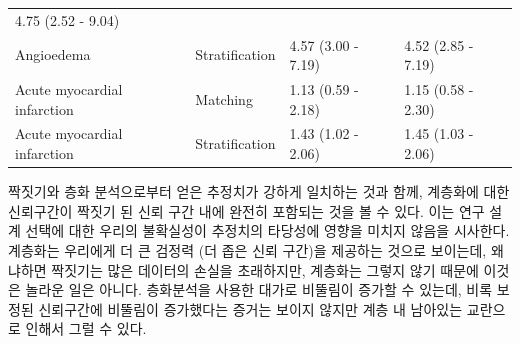 \documentclass[10.5pt]{book}
\theoremstyle{definition}
\theoremstyle{definition}
\theoremstyle{definition}
\theoremstyle{remark}
\begin{document}
\begin{longtable}[]{@{}llll@{}}
\begin{minipage}[t]{0.17\columnwidth}
4.75 (2.52 - 9.04)\strut
\end{minipage}\tabularnewline
\begin{minipage}[t]{0.27\columnwidth}\raggedright\strut
Angioedema\strut
\end{minipage} & \begin{minipage}[t]{0.15\columnwidth}\raggedright\strut
Stratification\strut
\end{minipage} & \begin{minipage}[t]{0.17\columnwidth}\raggedright\strut
4.57 (3.00 - 7.19)\strut
\end{minipage} & \begin{minipage}[t]{0.17\columnwidth}\raggedright\strut
4.52 (2.85 - 7.19)\strut
\end{minipage}\tabularnewline
\begin{minipage}[t]{0.27\columnwidth}\raggedright\strut
Acute myocardial infarction\strut
\end{minipage} & \begin{minipage}[t]{0.15\columnwidth}\raggedright\strut
Matching\strut
\end{minipage} & \begin{minipage}[t]{0.17\columnwidth}\raggedright\strut
1.13 (0.59 - 2.18)\strut
\end{minipage} & \begin{minipage}[t]{0.17\columnwidth}\raggedright\strut
1.15 (0.58 - 2.30)\strut
\end{minipage}\tabularnewline
\begin{minipage}[t]{0.27\columnwidth}\raggedright\strut
Acute myocardial infarction\strut
\end{minipage} & \begin{minipage}[t]{0.15\columnwidth}\raggedright\strut
Stratification\strut
\end{minipage} & \begin{minipage}[t]{0.17\columnwidth}\raggedright\strut
1.43 (1.02 - 2.06)\strut
\end{minipage} & \begin{minipage}[t]{0.17\columnwidth}\raggedright\strut
1.45 (1.03 - 2.06)\strut
\end{minipage}\tabularnewline
\bottomrule
\end{longtable}

짝짓기와 층화 분석으로부터 얻은 추정치가 강하게 일치하는 것과 함께,
계층화에 대한 신뢰구간이 짝짓기 된 신뢰 구간 내에 완전히 포함되는 것을
볼 수 있다. 이는 연구 설계 선택에 대한 우리의 불확실성이 추정치의
타당성에 영향을 미치지 않음을 시사한다. 계층화는 우리에게 더 큰 검정력
(더 좁은 신뢰 구간)을 제공하는 것으로 보이는데, 왜냐하면 짝짓기는 많은
데이터의 손실을 초래하지만, 계층화는 그렇지 않기 때문에 이것은 놀라운
일은 아니다. 층화분석을 사용한 대가로 비뚤림이 증가할 수 있는데, 비록
보정된 신뢰구간에 비뚤림이 증가했다는 증거는 보이지 않지만 계층 내
남아있는 교란으로 인해서 그럴 수 있다.
\end{document}
